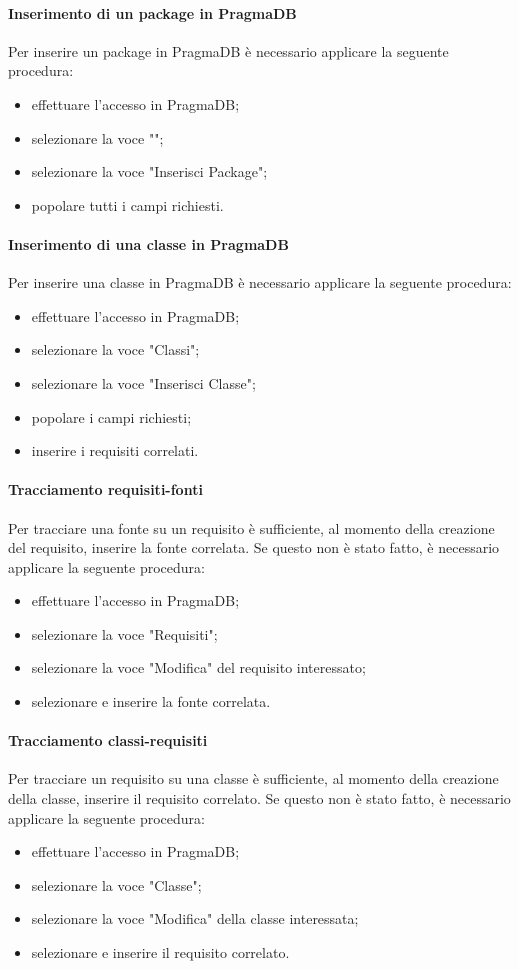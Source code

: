  \paragraph{Inserimento di un package in PragmaDB}
 Per inserire un package in PragmaDB è necessario applicare la seguente procedura:
 \begin{itemize}
 	\item effettuare l'accesso in PragmaDB;
 	\item selezionare la voce "";
 	\item selezionare la voce "Inserisci Package";
 	\item popolare tutti i campi richiesti.
 \end{itemize}
 \paragraph{Inserimento di una classe in PragmaDB}
 Per inserire una classe in PragmaDB è necessario applicare la seguente procedura:
 \begin{itemize}
 	\item effettuare l'accesso in PragmaDB;
 	\item selezionare la voce "Classi";
 	\item selezionare la voce "Inserisci Classe";
 	\item popolare i campi richiesti;
 	\item inserire i requisiti correlati.
 \end{itemize}
 \paragraph{Tracciamento requisiti-fonti}
 Per tracciare una fonte su un requisito è sufficiente, al momento della creazione del requisito, inserire la fonte correlata. Se questo non è stato fatto, è necessario applicare la seguente procedura:
 \begin{itemize}
 	\item effettuare l'accesso in PragmaDB;
 	\item selezionare la voce "Requisiti";
 	\item selezionare la voce "Modifica" del requisito interessato;
 	\item selezionare e inserire la fonte correlata.
 \end{itemize}
 \paragraph{Tracciamento classi-requisiti}
 Per tracciare un requisito su una classe è sufficiente, al momento della creazione della classe, inserire il requisito correlato. Se questo non è stato fatto, è necessario applicare la seguente procedura:
 \begin{itemize}
 	\item effettuare l'accesso in PragmaDB;
 	\item selezionare la voce "Classe";
 	\item selezionare la voce "Modifica" della classe interessata;
 	\item selezionare e inserire il requisito correlato.
 \end{itemize}
